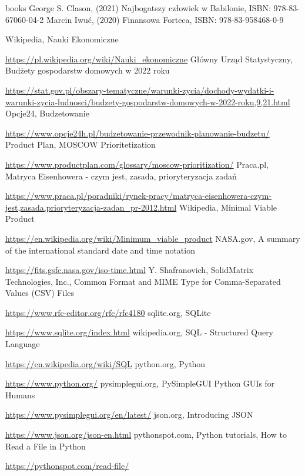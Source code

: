 \documentclass[a4paper,10pt, twoside]{report}
\begin{document}
\begin{thebibliography} {books}
     George S. Clason, (2021) Najbogatszy człowiek w Babilonie, ISBN: 978-83-67060-04-2    
     Marcin Iwuć, (2020) Finansowa Forteca, ISBN: 978-83-958468-0-9    
    
     Wikipedia, Nauki Ekonomiczne \raggedright\url{
        https://pl.wikipedia.org/wiki/Nauki_ekonomiczne}
     Główny Urząd Statystyczny, Budżety gospodarstw domowych w 2022 roku \raggedright\url{
        https://stat.gov.pl/obszary-tematyczne/warunki-zycia/dochody-wydatki-i-warunki-zycia-ludnosci/budzety-gospodarstw-domowych-w-2022-roku,9,21.html}
     Opcje24, Budzetowanie \raggedright\url{
        https://www.opcje24h.pl/budzetowanie-przewodnik-planowanie-budzetu/}
     Product Plan, MOSCOW Prioritetization \raggedright\url{
        https://www.productplan.com/glossary/moscow-prioritization/}
    Praca.pl, Matryca Eisenhowera - czym jest, zasada, prioryteryzacja zadań \raggedright\url{
        https://www.praca.pl/poradniki/rynek-pracy/matryca-eisenhowera-czym-jest,zasada,prioryteryzacja-zadan_pr-2012.html}
     Wikipedia, Minimal Viable Product \raggedright\url{
        https://en.wikipedia.org/wiki/Minimum_viable_product}
     NASA.gov, A summary of the international standard date and time notation \raggedright\url{
        https://fits.gsfc.nasa.gov/iso-time.html}
     Y. Shafranovich, SolidMatrix Technologies, Inc., Common Format and MIME Type for Comma-Separated Values (CSV) Files \raggedright\url{
        https://www.rfc-editor.org/rfc/rfc4180}
     sqlite.org, SQLite \raggedright\url{
        https://www.sqlite.org/index.html}
     wikipedia.org, SQL - Structured Query Language \raggedright\url{
        https://en.wikipedia.org/wiki/SQL}
     python.org, Python \raggedright\url{
        https://www.python.org/}
     pysimplegui.org, PySimpleGUI Python GUIs for Humans \raggedright\url{
        https://www.pysimplegui.org/en/latest/}
     json.org, Introducing JSON \raggedright\url{
        https://www.json.org/json-en.html}
     pythonspot.com, Python tutorials, How to Read a File in Python \raggedright\url{
        https://pythonspot.com/read-file/}

\end{thebibliography}
\end{document}
